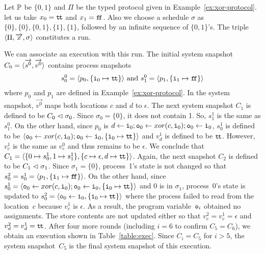  \begin{example}
  Let $\mathbb{P}$ be $\{0,1\}$ and $\Pi$ be the typed protocol given in
  Example~\ref{ex:xor-protocol}.
  let us take $x_0 = \texttt{t\kern -1.2pt t}$ and $x_1 = \texttt{f\kern -1.7pt f}$.
  Also we choose a schedule $\sigma$ as
  $\{0\}, \{0\}, \{0,1\}, \{1\}, \{1\}$, followed by an infinite
  sequence of $\{0,1\}$'s.
  The triple $\langle{\Pi,\overrightarrow x,\sigma}\rangle$ constitutes a run.

  We can associate an execution with this run.
  The initial system snapshot $C_0=\langle{\overrightarrow{s^0},\overrightarrow{v^0}}\rangle$ contains
  process snapshots
  \begin{align*}
   s_0^0 = \langle{p_0,\{\texttt{i}_0\mapsto \texttt{t\kern -1.2pt t}\}}\rangle\text{ and }
   s_1^0 = \langle{p_1,\{\texttt{i}_1\mapsto \texttt{f\kern -1.7pt f}\}}\rangle
  \end{align*}
  where $p_0$ and $p_1$ are defined in Example~\ref{ex:xor-protocol}.
  In the system snapshot, $\vec{v^0}$ maps both locations $c$ and $d$ to
  $\epsilon$.
  The next system snapshot $C_1$ is defined to be $C_0\vartriangleleft\sigma_0$.
  Since $\sigma_0 = \{0\}$, it does not contain 1.
  So, $s_1^1$ is the same as $s_1^0$.
  On the other hand, since $p_0$ is $d\leftarrow \texttt{i}_0; \texttt{o}_0\leftarrow
  xor(c, \texttt{i}_0); \texttt{o}_0
   \leftarrow \texttt{i}_0$, $s_0^1$ is defined to be
  $\langle{\texttt{o}_0\leftarrow
  xor(c, \texttt{i}_0); \texttt{o}_0
   \leftarrow \texttt{i}_0, \{\texttt{i}_0\mapsto \texttt{t\kern -1.2pt t}\}}\rangle$ and
  $v_d^1$ is defined to be $\texttt{t\kern -1.2pt t}$.
  However, $v_c^1$ is the same as $v_c^0$ and thus remains to be
  $\epsilon$.
  We conclude that $C_1=\langle{\{0\mapsto s_0^1,1\mapsto s_1^1\},
  \{c\mapsto \epsilon, d\mapsto \texttt{t\kern -1.2pt t}\}}\rangle$.
  Again, the next snapshot $C_2$ is defined to be $C_1\vartriangleleft \sigma_1$.
  Since $\sigma_1 = \{0\}$, process~1's state is not changed so that
  $s_0^2 = s_0^1 = \langle{p_1,\{\texttt{i}_1\mapsto\texttt{f\kern -1.7pt f}\}}\rangle$.
  On the other hand, since $s_0^1 = \langle{\texttt{o}_0\leftarrow
  xor(c, \texttt{i}_0); \texttt{o}_0
   \leftarrow \texttt{i}_0, \{\texttt{i}_0\mapsto \texttt{t\kern -1.2pt t}\}}\rangle$ and 0 is in $\sigma_1$,
  process~0's state is updated to
  $s_0^2 = \langle{\texttt{o}_0
   \leftarrow \texttt{i}_0, \{\texttt{i}_0\mapsto \texttt{t\kern -1.2pt t}\}}\rangle$
  where the process failed to read from the location~$c$ because $v_c^1$
  is $\epsilon$.  As a result, the program variable~$\texttt{o}_i$ obtained
  no assignments.
  The store contents are not updated either so that $v_c^2 = v_c^1 =
  \epsilon$ and $v_d^2 = v_d^1 = \texttt{t\kern -1.2pt t}$.
  After four more rounds (including $i = 6$ to confirm $C_5 = C_6$), we
  obtain an execution shown in Table~\ref{table:exec}.
  Since $C_i = C_5$ for $i > 5$, the system snapshot~$C_5$ is the final
  system snapshot of this execution.
 \end{example}
